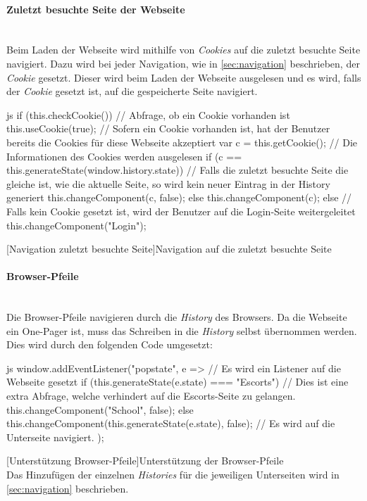 \paragraph{Zuletzt besuchte Seite der Webseite}~\\
Beim Laden der Webseite wird mithilfe von \textit{Cookies} auf die zuletzt besuchte Seite navigiert. Dazu wird bei jeder Navigation, wie in \autoref{sec:navigation} beschrieben, der \textit{Cookie} gesetzt. Dieser wird beim Laden der Webseite ausgelesen und es wird, falls der \textit{Cookie} gesetzt ist, auf die gespeicherte Seite navigiert.
\begin{code}{js}
	if (this.checkCookie()) {		// Abfrage, ob ein Cookie vorhanden ist
		this.useCookie(true);		// Sofern ein Cookie vorhanden ist, hat der Benutzer bereits die Cookies für diese Webseite akzeptiert
		var c = this.getCookie();	// Die Informationen des Cookies werden ausgelesen
		if (c == this.generateState(window.history.state)) {	// Falls die zuletzt besuchte Seite die gleiche ist, wie die aktuelle Seite, so wird kein neuer Eintrag in der History generiert
			this.changeComponent(c, false);
		} else {
			this.changeComponent(c);
		}
	} else {
		// Falls kein Cookie gesetzt ist, wird der Benutzer auf die Login-Seite weitergeleitet
		this.changeComponent("Login");
	}
\end{code}
[Navigation zuletzt besuchte Seite]{Navigation auf die zuletzt besuchte Seite}~\\

\paragraph{Browser-Pfeile}~\\
Die Browser-Pfeile navigieren durch die \textit{History} des Browsers. Da die Webseite ein One-Pager ist, muss das Schreiben in die \textit{History} selbst übernommen werden. Dies wird durch den folgenden Code umgesetzt:
\begin{code}{js}
window.addEventListener("popstate", e => {			// Es wird ein Listener auf die Webseite gesetzt
	if (this.generateState(e.state) === "Escorts") {	// Dies ist eine extra Abfrage, welche verhindert auf die Escorts-Seite zu gelangen.
		this.changeComponent("School", false);
	} else {
		this.changeComponent(this.generateState(e.state), false);	// Es wird auf die Unterseite navigiert.
	}
});
\end{code}
[Unterstützung Browser-Pfeile]{Unterstützung der Browser-Pfeile}~\\
Das Hinzufügen der einzelnen \textit{Histories} für die jeweiligen Unterseiten wird in \autoref{sec:navigation} beschrieben.
\newpage
